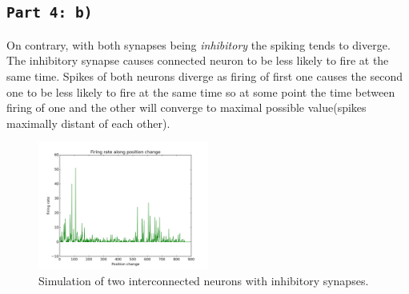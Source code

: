 \documentclass[12pt,a4paper,twocolumn]{article}
\begin{document}
\subsection*{\texttt{Part 4: b)}}
On contrary, with both synapses being \emph{inhibitory} the spiking tends to diverge. The inhibitory synapse causes connected neuron to be less likely to fire at the same time. Spikes of both neurons diverge as firing of first one causes the second one to be less likely to fire at the same time so at some point the time between firing of one and the other will converge to maximal possible value(spikes maximally distant of each other).

\begin{figure}[htbp]
\centering
\includegraphics[width=0.5\textwidth]{figure5.png}
\caption{Simulation of two interconnected neurons with inhibitory synapses.\label{fig:part4b}}
\vspace{0.2cm}
\end{figure}
\end{document}
